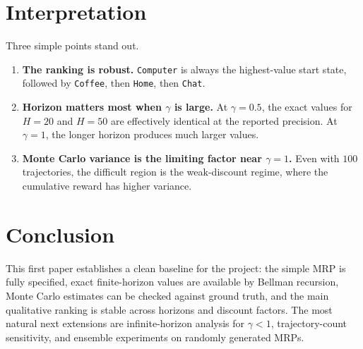 \documentclass[11pt]{article}
\begin{document}
\section{Interpretation}
Three simple points stand out.
\begin{enumerate}
  \item \textbf{The ranking is robust.} \texttt{Computer} is always the highest-value start state, followed by \texttt{Coffee}, then \texttt{Home}, then \texttt{Chat}.
  \item \textbf{Horizon matters most when $\gamma$ is large.} At $\gamma=0.5$, the exact values for $H=20$ and $H=50$ are effectively identical at the reported precision. At $\gamma=1$, the longer horizon produces much larger values.
  \item \textbf{Monte Carlo variance is the limiting factor near $\gamma=1$.} Even with $100$ trajectories, the difficult region is the weak-discount regime, where the cumulative reward has higher variance.
\end{enumerate}

\section{Conclusion}
This first paper establishes a clean baseline for the project: the simple MRP is fully specified, exact finite-horizon values are available by Bellman recursion, Monte Carlo estimates can be checked against ground truth, and the main qualitative ranking is stable across horizons and discount factors. The most natural next extensions are infinite-horizon analysis for $\gamma < 1$, trajectory-count sensitivity, and ensemble experiments on randomly generated MRPs.
\end{document}
